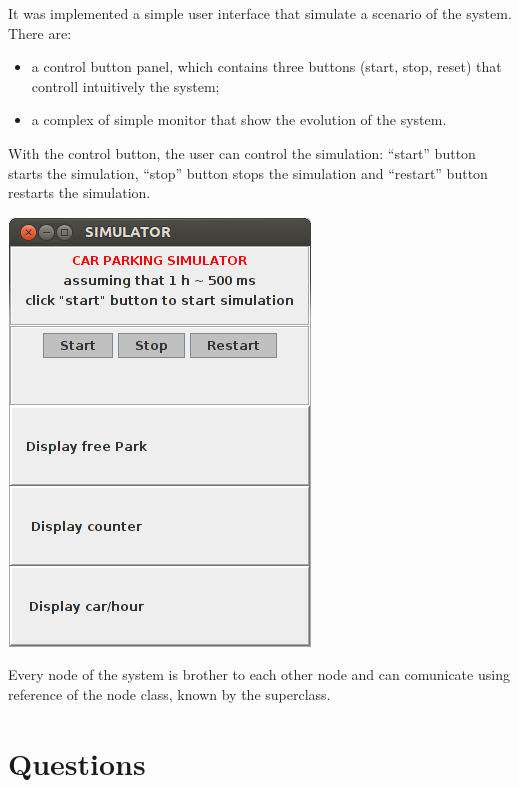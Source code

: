 \documentclass[a4paper,titlepage]{article}
\begin{document}
It was implemented a simple user interface that simulate a scenario of the system. There are:

\begin{itemize}

\item a control button panel, which contains three buttons (start, stop, reset) that controll intuitively the system;
\item a complex of simple monitor that show the evolution of the system.

\end{itemize}

With the control button, the user can control the simulation: ``start'' button starts the simulation, ``stop'' button stops the simulation and ``restart'' button restarts the simulation.

    \begin{center}

    \centering
    \includegraphics[scale=0.50]{interface.png}

    \end{center}

Every node of the system is brother to each other node and can comunicate using reference of the node class, known by the superclass.


\newpage
\part{Questions}
\end{document}
